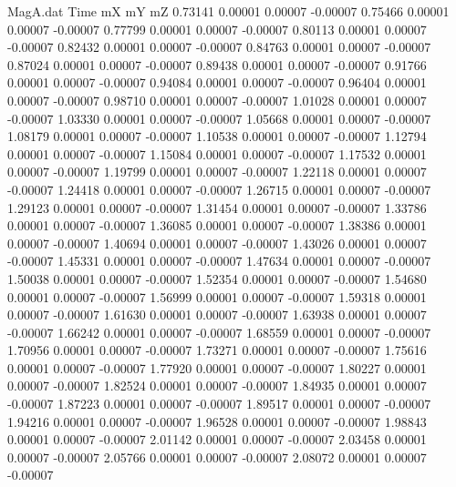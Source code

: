 \begin{filecontents}{MagA.dat}
Time mX mY mZ
   0.73141    0.00001    0.00007   -0.00007
   0.75466    0.00001    0.00007   -0.00007
   0.77799    0.00001    0.00007   -0.00007
   0.80113    0.00001    0.00007   -0.00007
   0.82432    0.00001    0.00007   -0.00007
   0.84763    0.00001    0.00007   -0.00007
   0.87024    0.00001    0.00007   -0.00007
   0.89438    0.00001    0.00007   -0.00007
   0.91766    0.00001    0.00007   -0.00007
   0.94084    0.00001    0.00007   -0.00007
   0.96404    0.00001    0.00007   -0.00007
   0.98710    0.00001    0.00007   -0.00007
   1.01028    0.00001    0.00007   -0.00007
   1.03330    0.00001    0.00007   -0.00007
   1.05668    0.00001    0.00007   -0.00007
   1.08179    0.00001    0.00007   -0.00007
   1.10538    0.00001    0.00007   -0.00007
   1.12794    0.00001    0.00007   -0.00007
   1.15084    0.00001    0.00007   -0.00007
   1.17532    0.00001    0.00007   -0.00007
   1.19799    0.00001    0.00007   -0.00007
   1.22118    0.00001    0.00007   -0.00007
   1.24418    0.00001    0.00007   -0.00007
   1.26715    0.00001    0.00007   -0.00007
   1.29123    0.00001    0.00007   -0.00007
   1.31454    0.00001    0.00007   -0.00007
   1.33786    0.00001    0.00007   -0.00007
   1.36085    0.00001    0.00007   -0.00007
   1.38386    0.00001    0.00007   -0.00007
   1.40694    0.00001    0.00007   -0.00007
   1.43026    0.00001    0.00007   -0.00007
   1.45331    0.00001    0.00007   -0.00007
   1.47634    0.00001    0.00007   -0.00007
   1.50038    0.00001    0.00007   -0.00007
   1.52354    0.00001    0.00007   -0.00007
   1.54680    0.00001    0.00007   -0.00007
   1.56999    0.00001    0.00007   -0.00007
   1.59318    0.00001    0.00007   -0.00007
   1.61630    0.00001    0.00007   -0.00007
   1.63938    0.00001    0.00007   -0.00007
   1.66242    0.00001    0.00007   -0.00007
   1.68559    0.00001    0.00007   -0.00007
   1.70956    0.00001    0.00007   -0.00007
   1.73271    0.00001    0.00007   -0.00007
   1.75616    0.00001    0.00007   -0.00007
   1.77920    0.00001    0.00007   -0.00007
   1.80227    0.00001    0.00007   -0.00007
   1.82524    0.00001    0.00007   -0.00007
   1.84935    0.00001    0.00007   -0.00007
   1.87223    0.00001    0.00007   -0.00007
   1.89517    0.00001    0.00007   -0.00007
   1.94216    0.00001    0.00007   -0.00007
   1.96528    0.00001    0.00007   -0.00007
   1.98843    0.00001    0.00007   -0.00007
   2.01142    0.00001    0.00007   -0.00007
   2.03458    0.00001    0.00007   -0.00007
   2.05766    0.00001    0.00007   -0.00007
   2.08072    0.00001    0.00007   -0.00007

\end{filecontents}
